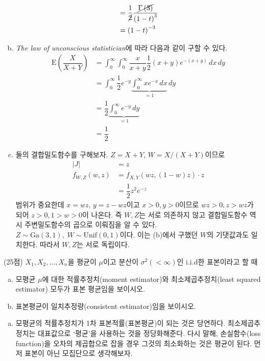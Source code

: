 \documentclass[answers]{exam}
\begin{document}
\begin{questions}
\begin{solution}
\begin{enumerate}[(a)]
\begin{align}
          &=\dfrac{1}{\cancel{2}}\dfrac{\cancel{\Gamma\left(3\right)}}{\left(1-t\right)^{3}}\\
          &=\left(1-t\right)^{-3}
        \end{align}
        \item \emph{The law of unconscious statistician}에 따라 다음과 같이 구할 수 있다.
        \begin{align}
          \mathrm{E}\left(\dfrac{X}{X+Y}\right) &= \int_{0}^{\infty}\int_{0}^{\infty}\dfrac{x}{x+y}\dfrac{1}{2}\left(x+y\right)e^{-\left(x+y\right)}\,dx\,dy\\
          &=\int_{0}^{\infty}\dfrac{1}{2}e^{-y}\underbrace{\int_{0}^{\infty}xe^{-x}\,dx}_{=1}\,dy\\
          &=\dfrac{1}{2}\underbrace{\int_{0}^{\infty}e^{-y}\,dy}_{=1}\\
          &=\dfrac{1}{2}
        \end{align}
        \item 둘의 결합밀도함수를 구해보자. $Z=X+Y$, $W=X/\left(X+Y\right)$이므로
        \begin{align}
          \left|J\right| &= z\\
          f_{W,Z}\left(w,z\right) &= f_{X,Y}\left(wz,\left(1-w\right)z\right)\cdot z\\
          &=\dfrac{1}{2}z^{2}e^{-z}
        \end{align}
        범위가 중요한데 $x=wz$, $y=z-wz$이고 $x>0,y>0$이므로 $wz>0, z>wz$가 되어 $z>0,1>w>0$이 나온다. 즉 $W,Z$는 서로 의존하지 않고 결합밀도함수 역시 주변밀도함수의 곱으로 이뤄짐을 알 수 있다. $Z\sim\mathrm{Ga}\left(3,1\right),\; W\sim\mathrm{Unif}\left(0,1\right)$이다. 이는 (b)에서 구했던 $W$의 기댓값과도 일치한다. 따라서 $W,Z$는 서로 독립이다.
      \end{enumerate}
    \end{solution}
    \question
    (25점) $X_{1},X_{2},\ldots,X_{n}$을 평균이 $\mu$이고 분산이 $\sigma^{2}(<\infty)$인 i.i.d한 표본이라고 할 때
    \begin{enumerate}[(a)]
      \item 모평균 $\mu$에 대한 적률추정치(moment estimator)와 최소제곱추정치(least squared estimator) 모두가 표본 평균임을 보이시오.
      \item 표본평균이 일치추정량(consistent estimator)임을 보이시오.
    \end{enumerate}
    \begin{solution}
      \begin{enumerate}[(a)]
        \item 모평균의 적률추정치가 1차 표본적률(표본평균)이 되는 것은 당연하다. 최소제곱추정치는 대표값으로 `평균'을 사용하는 것을 정당화해준다. 다시 말해, 손실함수(loss function)을 오차의 제곱합으로 잡을 경우 그것의 최소화하는 것은 평균이 된다. 먼저 표본이 아닌 모집단으로 생각해보자.

\end{enumerate}
\end{solution}
\end{questions}
\end{document}
